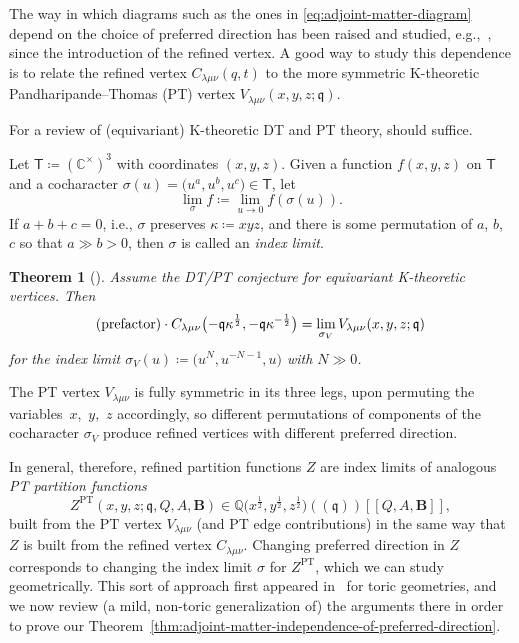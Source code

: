 \documentclass[10pt,a4paper]{amsart}
\numberwithin{equation}{section}
\newtheorem{Theorem}{Theorem}[section]
\renewcommand{\vec}[1]{\bm{#1}}
\newcommand{\bC}{\mathbb{C}}
\newcommand{\bQ}{\mathbb{Q}}
\newcommand{\fq}{\mathfrak{q}}
\newcommand{\sT}{\mathsf{T}}
\DeclareMathOperator{\PT}{PT}
\begin{document}
\begin{MyParagraph}
The way in which diagrams such as the ones in
\eqref{eq:adjoint-matter-diagram} depend on the choice of preferred
direction has been raised \cite{Iqbal2009} and studied, e.g.,~\cite{Awata2013}, since the introduction of the refined vertex. A good
way to study this dependence is to relate the refined vertex
$C_{\lambda\mu\nu}(q,t)$ to the more symmetric K-theoretic
Pandharipande--Thomas (PT) vertex $V_{\lambda\mu\nu}(x,y,z;\fq)$.

For a review of (equivariant) K-theoretic DT and PT theory,
\cite{Okounkov2017} should suffice.

\begin{Definition}
 Let $\sT \coloneqq (\bC^\times)^3$ with coordinates $(x, y, z)$.
 Given a function $f(x,y,z)$ on $\sT$ and a cocharacter
 $\sigma(u) = \big(u^a, u^b, u^c\big) \in \sT$, let
 \[ \lim_\sigma f \coloneqq \lim_{u \to 0} f(\sigma(u)). \]
 If $a+b+c = 0$, i.e., $\sigma$ preserves $\kappa \coloneqq xyz$, and
 there is some permutation of $a$, $b$, $c$ so that $a \gg b > 0$, then
 $\sigma$ is called an {\it index limit}.
\end{Definition}

\begin{Theorem}[{\cite[Theorem~2]{Nekrasov2016a}}] \label{thm:PT-to-refined-vertex}
 Assume the DT/PT conjecture {\rm \cite[formula~(16)]{Nekrasov2016a}} for
 equivariant K-theoretic vertices. Then
 \begin{equation*} %
 (\text{\rm prefactor}) \cdot C_{\lambda\mu\nu}\big({-}\fq\kappa^{\frac{1}{2}}, -\fq\kappa^{-\frac{1}{2}}\big) = \lim_{\sigma_V} V_{\lambda\mu\nu}(x, y, z; \fq)
 \end{equation*}
 for the index limit $\sigma_V(u) \coloneqq \big(u^N, u^{-N-1}, u\big)$ with
 $N \gg 0$.
\end{Theorem}

The PT vertex $V_{\lambda\mu\nu}$ is fully symmetric in its three
legs, upon permuting the variables~$x$,~$y$,~$z$ accordingly, so different
permutations of components of the cocharacter $\sigma_V$ produce refined
vertices with different preferred direction.

In general, therefore, refined partition functions $Z$ are index
limits of analogous {\it PT partition functions}
\begin{equation}\label{eq:PT-partition-function}
 Z^{\PT}(x,y,z; \fq, Q,A,\vec B) \in \bQ\big(x^{\frac{1}{2}},y^{\frac{1}{2}},z^{\frac{1}{2}}\big)((\fq))[[Q,A,\vec B]],
\end{equation}
built from the PT vertex $V_{\lambda\mu\nu}$ (and PT edge
contributions) in the same way that $Z$ is built from the refined
vertex $C_{\lambda\mu\nu}$. Changing preferred direction in $Z$
corresponds to changing the index limit $\sigma$ for $Z^{\PT}$, which
we can study geometrically. This sort of approach first appeared in~\cite{Arbesfeld2021} for toric geometries, and we now review (a mild,
non-toric generalization of) the arguments there in order to prove our
Theorem~\ref{thm:adjoint-matter-independence-of-preferred-direction}.
\end{MyParagraph}
\end{document}
